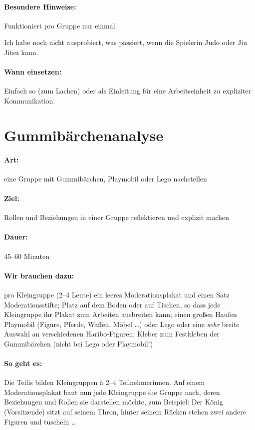 \paragraph{Besondere Hinweise:} Funktioniert pro Gruppe nur einmal.

Ich habe noch nicht ausprobiert, was passiert, wenn die Spielerin Judo oder Jiu Jitsu kann.
\paragraph{Wann einsetzen:} Einfach so (zum Lachen) oder als Einleitung für eine Arbeitseinheit zu expliziter Kommunikation.


\section{Gummibärchenanalyse}
\paragraph{Art:} eine Gruppe mit Gummibärchen, Playmobil oder Lego nachstellen
\paragraph{Ziel:} Rollen und Beziehungen in einer Gruppe reflektieren und explizit machen
\paragraph{Dauer:} 45--60 Minuten
\paragraph{Wir brauchen dazu:} pro Kleingruppe (2--4 Leute) ein leeres Moderationsplakat und einen Satz Moderationsstifte; Platz auf dem Boden oder auf Tischen, so dass jede Kleingruppe ihr Plakat zum Arbeiten ausbreiten kann; einen großen Haufen Playmobil (Figure, Pferde, Waffen, Möbel \ldots) oder Lego oder eine \emph{sehr} breite Auswahl an verschiedenen Haribo-Figuren; Kleber zum Festkleben der Gummibärchen (nicht bei Lego oder Playmobil!)
\paragraph{So geht es:} Die Teilis bilden Kleingruppen à 2--4 Teilnehmerinnen. Auf einem Moderationsplakat baut nun jede Kleingruppe die Gruppe nach, deren Beziehungen und Rollen sie darstellen möchte, zum Beispiel: Der König (Vorsitzende) sitzt auf seinem Thron, hinter seinem Rücken stehen zwei andere Figuren und tuscheln \ldots

